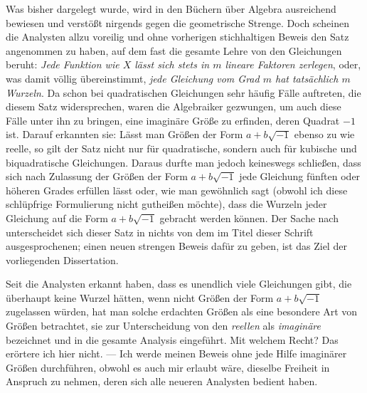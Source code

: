 Was bisher dargelegt wurde, wird in den Büchern über Algebra ausreichend bewiesen und verstößt nirgends gegen die geometrische Strenge. Doch scheinen die Analysten allzu voreilig und ohne vorherigen stichhaltigen Beweis den Satz angenommen zu haben, auf dem fast die gesamte Lehre von den Gleichungen beruht: \textit{Jede Funktion wie $X$ lässt sich stets in $m$ lineare Faktoren zerlegen}, oder, was damit völlig übereinstimmt, \textit{jede Gleichung vom Grad $m$ hat tatsächlich $m$ Wurzeln}. Da schon bei quadratischen Gleichungen sehr häufig Fälle auftreten, die diesem Satz widersprechen, waren die Algebraiker gezwungen, um auch diese Fälle unter ihn zu bringen, eine imaginäre Größe zu erfinden, deren Quadrat $-1$ ist. Darauf erkannten sie: Lässt man Größen der Form $a+b\sqrt{-1}$ ebenso zu wie reelle, so gilt der Satz nicht nur für quadratische, sondern auch für kubische und biquadratische Gleichungen. Daraus durfte man jedoch keineswegs schließen, dass sich nach Zulassung der Größen der Form $a+b\sqrt{-1}$ jede Gleichung fünften oder höheren Grades erfüllen lässt oder, wie man gewöhnlich sagt (obwohl ich diese schlüpfrige Formulierung nicht gutheißen möchte), dass die Wurzeln jeder Gleichung auf die Form $a+b\sqrt{-1}$ gebracht werden können. Der Sache nach unterscheidet sich dieser Satz in nichts von dem im Titel dieser Schrift ausgesprochenen; einen neuen strengen Beweis dafür zu geben, ist das Ziel der vorliegenden Dissertation.

Seit die Analysten erkannt haben, dass es unendlich viele Gleichungen gibt, die überhaupt keine Wurzel hätten, wenn nicht Größen der Form $a+b\sqrt{-1}$ zugelassen würden, hat man solche erdachten Größen als eine besondere Art von Größen betrachtet, sie zur Unterscheidung von den \textit{reellen} als \textit{imaginäre} bezeichnet und in die gesamte Analysis eingeführt. Mit welchem Recht? Das erörtere ich hier nicht. --- Ich werde meinen Beweis ohne jede Hilfe imaginärer Größen durchführen, obwohl es auch mir erlaubt wäre, dieselbe Freiheit in Anspruch zu nehmen, deren sich alle neueren Analysten bedient haben.

